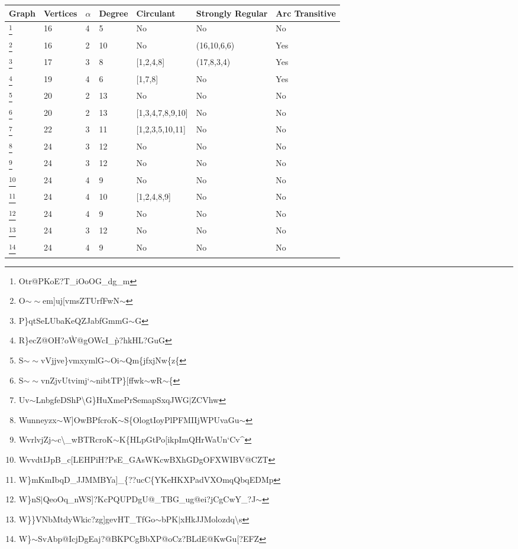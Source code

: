 \documentclass[12pt]{article}
\theoremstyle{parenbold}
\begin{document}
\renewcommand{\thempfootnote}{\arabic{mpfootnote}}
\begin{center}
\begin{minipage}{\textwidth}
\begin{tabular}{ |p{1cm}|p{1.5cm}|p{0.5cm}|p{1.5cm}|p{2.7cm}|p{2cm}|p{1cm}| } 
 \hline
 Graph & Vertices & $\alpha$ & Degree & Circulant & Strongly Regular & Arc Transitive\\ 
 \hline
 \footnote{Otr@PKoE?T\_iOoOG\_dg\_m\label{graph1}} & 16 & 4 & 5 & No & No & No\\
 \hline
 \footnote{O$\sim\sim$em]uj[vmsZTUrfFwN$\sim$\label{graph2}} & 16 & 2 & 10 & No & (16,10,6,6) & Yes \\
 \hline
 \footnote{P\}qtSeLUbaKeQZJabfGmmG$\sim$G\label{graph3}} & 17 &  3 & 8 & [1,2,4,8] & (17,8,3,4) & Yes\\
 \hline
 \footnote{R\}ecZ@OH?o\`W@gOWcI\_\`p?hkHL?GuG\label{graph4}} & 19 & 4 & 6 & [1,7,8] & No & Yes \\
 \hline
 \footnote{S$\sim\sim$vVjjve\}vmxymlG$\sim$Oi$\sim$Qm\{jfxjNw\{z\{\label{graph5}} & 20 & 2 & 13 & No & No & No\\
 \hline
 \footnote{S$\sim\sim$vnZjvUtvimj`$\sim$nibtTP\}[ffwk$\sim$wR$\sim$\{\label{graph6}} & 20 & 2 & 13 & [1,3,4,7,8,9,10] & No & No\\
 \hline
 \footnote{Uv$\sim$LnbgfeDShP\textbackslash{}G\}HuXmePrSemapSxqJWG$\vert$ZCVhw\label{graph7}} & 22 & 3 & 11 & [1,2,3,5,10,11] & No & No\\
 \hline
 \footnote{Wunneyzx$\sim$W]OwBPfcroK$\sim$S\{OlogtIoyPlPFMIIjWPUvaGu$\sim$\label{graph8}} & 24 & 3 & 12 & No & No & No\\
 \hline
 \footnote{WvrlvjZj$\sim$c\textbackslash{}\_wBTRcroK$\sim$K\{HLpGtPo[ikpImQHrWaUn`Cv\^{}\label{graph9}} & 24 & 3 & 12 & No & No & No\\
 \hline
 \footnote{WvvdtIJpB\_c[LEHPiH?PsE\_GAsWKcwBXhGDgOFXWIBV@CZT\label{graph10}} & 24 & 4 & 9 & No & No & No\\
 \hline
 \footnote{W\}mKmIbqD\_JJMMBYa]\_\{??ucC\{YKeHKXPadVXOmqQbqEDMp\label{graph11}} & 24 & 4 & 10 & [1,2,4,8,9] & No & No\\
 \hline
 \footnote{W\}nS$\vert$QeoOq\_nWS]?KcPQUPDgU@\_TBG\_ug@ei?jCgCwY\_?J$\sim$\label{graph12}} & 24 & 4 & 9 & No & No & No\\
 \hline
 \footnote{W\}\}VNbMtdyWkic?zg]gevHT\_TfGo$\sim$bPK$\vert$xHkJJMolozdq\textbackslash{}s\label{graph13}} & 24 & 3 & 12 & No & No & No\\
 \hline
 \footnote{W\}$\sim$SvAbp@IcjDgEaj?@BKPCgBbXP@oCz?BLdE@KwGu[?EFZ\label{graph14}} & 24 & 4 & 9 & No & No & No\\

\end{tabular}
\end{minipage}
\end{center}
\end{document}

